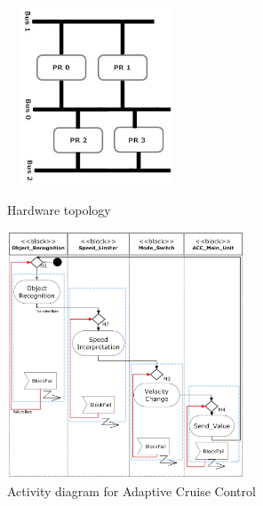 \documentclass[3p,times,procedia,authoryear,round]{elsarticle}
\begin{document}
\begin{figure}[!htb]
	\centering
	\begin{minipage}{.5\textwidth}
		\centering
	\includegraphics[width=150pt, height=150pt]{hardwareTopology.jpg}
	\caption{Hardware topology}
	\label{topo}
	\end{minipage}%
	\begin{minipage}{0.5\textwidth}
		\centering
	\includegraphics[width=200pt]{ActivityACC.jpg}
	\caption{Activity diagram for Adaptive Cruise Control}
	\label{acc1}
	\end{minipage}
\end{figure}
\end{document}

